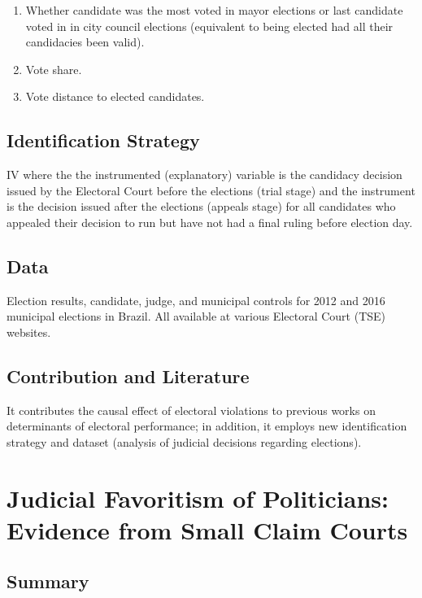 \documentclass[]{article}
\begin{document}
\begin{enumerate}
\item
  Whether candidate was the most voted in mayor elections or last
  candidate voted in in city council elections (equivalent to being
  elected had all their candidacies been valid).
\item
  Vote share.
\item
  Vote distance to elected candidates.
\end{enumerate}

\hypertarget{identification-strategy}{%
\subsection{Identification Strategy}\label{identification-strategy}}

IV where the the instrumented (explanatory) variable is the candidacy
decision issued by the Electoral Court before the elections (trial
stage) and the instrument is the decision issued after the elections
(appeals stage) for all candidates who appealed their decision to run
but have not had a final ruling before election day.

\hypertarget{data}{%
\subsection{Data}\label{data}}

Election results, candidate, judge, and municipal controls for 2012 and
2016 municipal elections in Brazil. All available at various Electoral
Court (TSE) websites.

\hypertarget{contribution-and-literature}{%
\subsection{Contribution and
Literature}\label{contribution-and-literature}}

It contributes the causal effect of electoral violations to previous
works on determinants of electoral performance; in addition, it employs
new identification strategy and dataset (analysis of judicial decisions
regarding elections).

\hypertarget{title2}{%
\section{Judicial Favoritism of Politicians: Evidence from Small Claim
Courts}\label{title2}}

\hypertarget{summary-1}{%
\subsection{Summary}\label{summary-1}}
\end{document}
